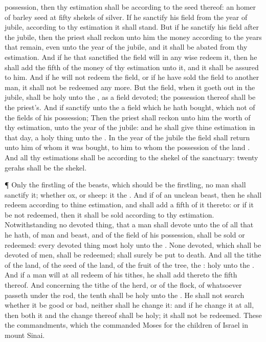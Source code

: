 {possession, then thy
estimation shall be
according to the
seed thereof: an
homer of
barley
seed
{} at
fifty
shekels of
silver.
If he
sanctify his
field from the
year of
jubile, according to thy
estimation it shall
stand.
But if he
sanctify his
field
after the
jubile, then the
priest shall
reckon unto him the
money according
to the
years that
remain, even unto the
year of the
jubile, and it shall be
abated from thy
estimation.
And if he that
sanctified the
field will in any
wise
redeem it, then he shall
add the
fifth
{} of the
money of thy
estimation unto it, and it shall be
assured to him.
And if he will not
redeem the
field, or if he have
sold the
field to
another
man, it shall not be
redeemed any more.
But the
field, when it goeth
out in the
jubile, shall be
holy unto the
{}, as a
field
devoted; the
possession thereof shall be the
priest’s.
And if
{}
sanctify unto the
{} a
field which he hath
bought, which
{} not of the
fields of his
possession;
Then the
priest shall
reckon unto him the
worth of thy
estimation,
{} unto the
year of the
jubile: and he shall
give thine
estimation in that
day,
{} a holy
thing unto the
{}.
In the
year of the
jubile the
field shall
return unto him of whom it was
bought,
{} to him to whom the
possession of the
land
{}.
And all thy
estimations shall be according to the
shekel of the
sanctuary:
twenty
gerahs shall be the
shekel.
\par }{\PP {}¶ Only the
firstling of the
beasts, which should be the
{}
firstling, no
man shall
sanctify it; whether
{}
ox, or
sheep: it
{} the
{}.
And if
{} of an
unclean
beast, then he shall
redeem
{} according to thine
estimation, and shall
add a
fifth
{} of it thereto: or if it be not
redeemed, then it shall be
sold according to thy
estimation.
Notwithstanding no devoted
thing, that a
man shall
devote unto the
{} of all that he hath,
{} of
man and
beast, and of the
field of his
possession, shall be
sold or
redeemed: every devoted
thing
{}
most
holy unto the
{}.
None
devoted, which shall
be
devoted of
men, shall be
redeemed;
{} shall
surely be put to
death.
And all the
tithe of the
land,
{} of the
seed of the
land,
{} of the
fruit of the
tree,
{} the
{}:
{}
holy unto the
{}.
And if a
man will at
all
redeem
{} of his
tithes, he shall
add thereto the
fifth
{} thereof.
And concerning the
tithe of the
herd, or of the
flock,
{} of whatsoever
passeth under the
rod, the
tenth shall be
holy unto the
{}.
He shall not
search whether it be
good or
bad, neither shall he
change it: and if he
change it at
all, then both it and the
change thereof shall be
holy; it shall not be
redeemed.
These
{} the
commandments, which the
{}
commanded
Moses for the
children of
Israel in
mount
Sinai.
\par }
